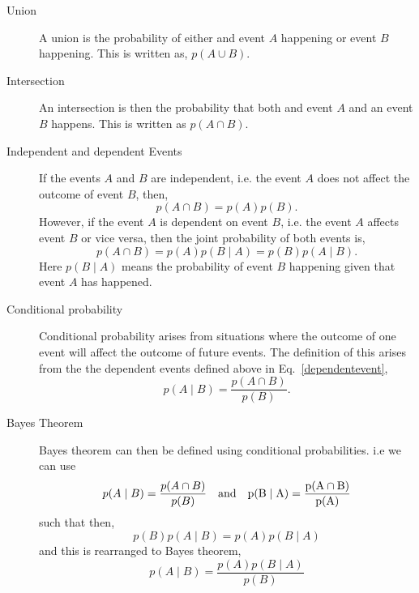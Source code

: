 \begin{description}
	\item [Union]
	A union is the probability of either and event $A$ happening or event $B$ happening. This is written as, $p(A \cup B)$.
	
	\item [Intersection]
	An intersection is then the probability that both and event $A$ and an event $B$ happens. This is written as $p(A \cap B)$.
	
	\item [Independent and dependent Events]
	If the events $A$ and $B$ are independent, i.e. the event $A$ does not affect the outcome of event $B$, then,
	\begin{equation}
	p(A \cap B) = p(A)p(B).
	\end{equation}
	However, if the event $A$ is dependent on event $B$, i.e. the event $A$ affects event $B$ or vice versa, then the joint probability of both events is,
	\begin{equation}
	\label{dependentevent}
	p(A \cap B) = p(A)p(B \mid A) = p(B)p(A \mid B).
	\end{equation}
	Here $p(B \mid A)$ means the probability of event $B$ happening given that event $A$ has happened.
	
	\item [Conditional probability]
	Conditional probability arises from situations where the outcome of one event will affect the outcome of future events.
	The definition of this arises from the the dependent events defined above in Eq.~\ref{dependentevent},
	\begin{equation}
	p(A \mid B) = \frac{p(A \cap B)}{p(B)}.
	\end{equation}
	
	\item [Bayes Theorem]
	Bayes theorem can then be defined using conditional probabilities. i.e we can use
	\begin{equation}
	p(A \mid B) = \frac{p(A \cap B)}{p(B)} \quad \rm{and} \quad p(B \mid A) = \frac{p(A \cap B)}{p(A)}
	\end{equation}
	such that then,
	\begin{equation}
	p(B)p(A \mid B) = p(A)p(B \mid A)
	\end{equation}
	and this is rearranged to Bayes theorem,
	\begin{equation}
	p(A \mid B) = \frac{p(A)p(B \mid A)}{p(B)}
	\end{equation}
	
\end{description}

